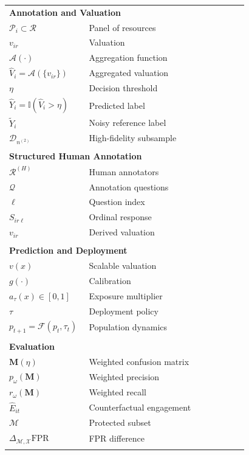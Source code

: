 \documentclass[12pt]{article}
\begin{document}
\begin{longtable}{p{0.32\linewidth} p{0.64\linewidth}}
\multicolumn{2}{l}{\textbf{Annotation and Valuation}} \\
$\mathcal{P}_i \subset \mathcal{R}$ & Panel of resources \\
$v_{ir}$ & Valuation \\
$\mathcal{A}(\cdot)$ & Aggregation function \\
$\hat{V}_i = \mathcal{A}(\{v_{ir}\})$ & Aggregated valuation \\
$\eta$ & Decision threshold \\
$\hat{Y}_i = \mathbb{I}(\hat{V}_i > \eta)$ & Predicted label \\
$\tilde{Y}_i$ & Noisy reference label \\
$\mathcal{D}_{n^{(2)}}$ & High-fidelity subsample \\
\\[3pt]

\multicolumn{2}{l}{\textbf{Structured Human Annotation}} \\
$\mathcal{R}^{(H)}$ & Human annotators \\
$\mathcal{Q}$ & Annotation questions \\
$\ell$ & Question index \\
$S_{ir\ell}$ & Ordinal response \\
$v_{ir}$ & Derived valuation \\
\\[3pt]

\multicolumn{2}{l}{\textbf{Prediction and Deployment}} \\
$v(x)$ & Scalable valuation \\
$g(\cdot)$ & Calibration \\
$a_\tau(x) \in [0,1]$ & Exposure multiplier \\
$\tau$ & Deployment policy \\
$p_{t+1} = \mathcal{F}(p_t, \tau_t)$ & Population dynamics \\
\\[3pt]

\multicolumn{2}{l}{\textbf{Evaluation}} \\
$\mathbf{M}(\eta)$ & Weighted confusion matrix \\
$p_{\omega}(\mathbf{M})$ & Weighted precision \\
$r_{\omega}(\mathbf{M})$ & Weighted recall \\
$\hat{E}_{it}$ & Counterfactual engagement \\
$\mathcal{M}$ & Protected subset \\
$\Delta_{\mathcal{M},\mathcal{X}}\mathrm{FPR}$ & FPR difference \\
\\[3pt]


\end{longtable}
\end{document}
